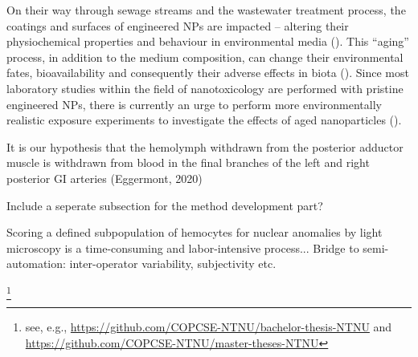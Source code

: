 On their way through sewage streams and the wastewater treatment process, the coatings and surfaces of engineered NPs are impacted – altering their physiochemical properties and behaviour in environmental media (\cite{Kaegi2013}). This “aging” process, in addition to the medium composition, can change their environmental fates, bioavailability and consequently their adverse effects in biota (\cite{Metreveli2016, Georgantzopoulou2020}). Since most laboratory studies within the field of nanotoxicology are performed with pristine engineered NPs, there is currently an urge to perform more environmentally realistic exposure experiments to investigate the effects of aged nanoparticles (\cite{Metreveli2016}).



It is our hypothesis that the hemolymph withdrawn from the posterior adductor muscle is withdrawn from blood in the final branches of the left and right posterior GI arteries (Eggermont, 2020)



Include a seperate subsection for the method development part?

Scoring a defined subpopulation of hemocytes for nuclear anomalies by light microscopy is a time-consuming and labor-intensive process... Bridge to semi-automation: inter-operator variability, subjectivity etc.




\footnote{see, e.g., 
\url{https://github.com/COPCSE-NTNU/bachelor-thesis-NTNU} and \url{https://github.com/COPCSE-NTNU/master-theses-NTNU}}
